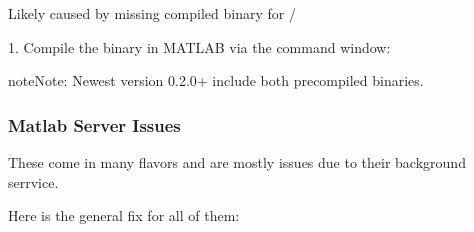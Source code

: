\documentclass[letterpaper,10pt,english]{sphinxmanual}
\begin{document}
\sphinxAtStartPar
{} Likely caused by missing compiled binary for / 

\sphinxAtStartPar
{}
1. Compile the binary in MATLAB via the command window:

\begin{sphinxVerbatim}[commandchars=\\\{\}]
\end{sphinxVerbatim}

\begin{sphinxadmonition}{note}{Note:}
\sphinxAtStartPar
Newest version 0.2.0+ include both precompiled binaries.
\end{sphinxadmonition}


\subsubsection{Matlab Server Issues}
\label{\detokenize{user_guide/troubleshooting:matlab-server-issues}}\label{\detokenize{user_guide/troubleshooting:server-issues}}
\sphinxAtStartPar
These come in many flavors and are mostly  issues due to their background serrvice.

\sphinxAtStartPar
Here is the general fix for all of them:
\end{document}
